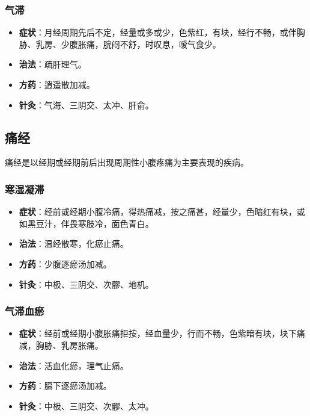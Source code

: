 \documentclass[12pt,UTF8]{ctexbook}
\begin{document}
\subsubsection{气滞}

\begin{itemize}
\item \textbf{症状}：月经周期先后不定，经量或多或少，色紫红，有块，经行不畅，或伴胸胁、乳房、少腹胀痛，脘闷不舒，时叹息，嗳气食少。
\item \textbf{治法}：疏肝理气。
\item \textbf{方药}：逍遥散加减。
\item \textbf{针灸}：气海、三阴交、太冲、肝俞。
\end{itemize}

\subsection{痛经}

痛经是以经期或经期前后出现周期性小腹疼痛为主要表现的疾病。

\subsubsection{寒湿凝滞}

\begin{itemize}
\item \textbf{症状}：经前或经期小腹冷痛，得热痛减，按之痛甚，经量少，色暗红有块，或如黑豆汁，伴畏寒肢冷，面色青白。
\item \textbf{治法}：温经散寒，化瘀止痛。
\item \textbf{方药}：少腹逐瘀汤加减。
\item \textbf{针灸}：中极、三阴交、次髎、地机。
\end{itemize}

\subsubsection{气滞血瘀}

\begin{itemize}
\item \textbf{症状}：经前或经期小腹胀痛拒按，经血量少，行而不畅，色紫暗有块，块下痛减，胸胁、乳房胀痛。
\item \textbf{治法}：活血化瘀，理气止痛。
\item \textbf{方药}：膈下逐瘀汤加减。
\item \textbf{针灸}：中极、三阴交、次髎、太冲。
\end{itemize}
\end{document}
